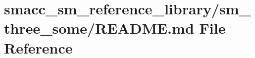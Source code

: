 \hypertarget{smacc__sm__reference__library_2sm__three__some_2README_8md}{}\section{smacc\+\_\+sm\+\_\+reference\+\_\+library/sm\+\_\+three\+\_\+some/\+R\+E\+A\+D\+ME.md File Reference}
\label{smacc__sm__reference__library_2sm__three__some_2README_8md}
